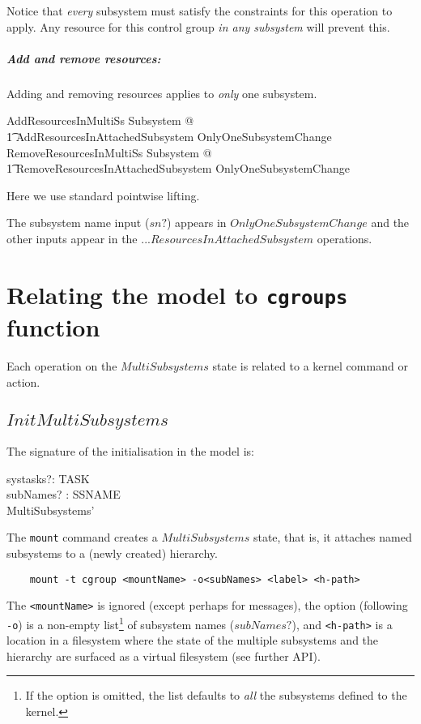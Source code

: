 \documentclass[a4paper,twoside,12pt]{article}
\begin{document}
Notice that \emph{every} subsystem must satisfy the constraints for this operation to apply.
Any resource for this control group \emph{in any subsystem} will prevent this.

\subparagraph{Add and remove resources:}

Adding and removing resources applies to \emph{only} one subsystem.

\begin{zed}
AddResourcesInMultiSs   \exists \Delta Subsystem @ \\
    \t1 AddResourcesInAttachedSubsystem \land OnlyOneSubsystemChange
\also
RemoveResourcesInMultiSs   \exists \Delta Subsystem @ \\
    \t1 RemoveResourcesInAttachedSubsystem \land OnlyOneSubsystemChange
\end{zed}
Here we use standard pointwise lifting.

The subsystem name input ($sn?$) appears in $OnlyOneSubsystemChange$
and the other inputs appear in the ...$ResourcesInAttachedSubsystem$ operations.

\section{Relating the model to \texttt{cgroups} function}
\label{sec:kernel}

Each operation on the $MultiSubsystems$ state is related to a kernel command or action. 

\subsection{$InitMultiSubsystems$}

The signature of the initialisation in the model is:

\begin{schema*}
    systasks?: \finset TASK \\
    subNames? : \finset SSNAME \\
\also
  MultiSubsystems'
\end{schema*}
The \texttt{mount} command creates a $MultiSubsystems$ state, that is, it attaches named subsystems to a 
(newly created) hierarchy.

\begin{verbatim}
    mount -t cgroup <mountName> -o<subNames> <label> <h-path>
\end{verbatim}
The \texttt{<mountName>} is ignored (except perhaps for messages), 
the option (following \texttt{-o}) is a non-empty list\footnote{If the option is omitted, the list defaults 
to \emph{all} the subsystems defined to the kernel.} of subsystem names
($subNames?$), and \texttt{<h-path>} is a location in a filesystem
where the state of the multiple subsystems and the hierarchy are surfaced as a virtual filesystem (see further API).
\end{document}
